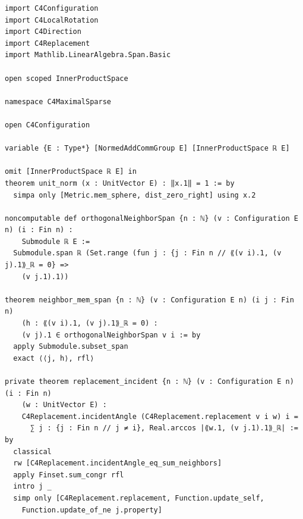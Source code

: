 \documentclass[11pt,a4paper]{article}
\begin{document}
\begin{Verbatim}[breaklines,breakanywhere,fontsize=\footnotesize]
import C4Configuration
import C4LocalRotation
import C4Direction
import C4Replacement
import Mathlib.LinearAlgebra.Span.Basic

open scoped InnerProductSpace

namespace C4MaximalSparse

open C4Configuration

variable {E : Type*} [NormedAddCommGroup E] [InnerProductSpace ℝ E]

omit [InnerProductSpace ℝ E] in
theorem unit_norm (x : UnitVector E) : ‖x.1‖ = 1 := by
  simpa only [Metric.mem_sphere, dist_zero_right] using x.2

noncomputable def orthogonalNeighborSpan {n : ℕ} (v : Configuration E n) (i : Fin n) :
    Submodule ℝ E :=
  Submodule.span ℝ (Set.range (fun j : {j : Fin n // ⟪(v i).1, (v j).1⟫_ℝ = 0} =>
    (v j.1).1))

theorem neighbor_mem_span {n : ℕ} (v : Configuration E n) (i j : Fin n)
    (h : ⟪(v i).1, (v j).1⟫_ℝ = 0) :
    (v j).1 ∈ orthogonalNeighborSpan v i := by
  apply Submodule.subset_span
  exact ⟨⟨j, h⟩, rfl⟩

private theorem replacement_incident {n : ℕ} (v : Configuration E n) (i : Fin n)
    (w : UnitVector E) :
    C4Replacement.incidentAngle (C4Replacement.replacement v i w) i =
      ∑ j : {j : Fin n // j ≠ i}, Real.arccos |⟪w.1, (v j.1).1⟫_ℝ| := by
  classical
  rw [C4Replacement.incidentAngle_eq_sum_neighbors]
  apply Finset.sum_congr rfl
  intro j _
  simp only [C4Replacement.replacement, Function.update_self,
    Function.update_of_ne j.property]


\end{Verbatim}
\end{document}
